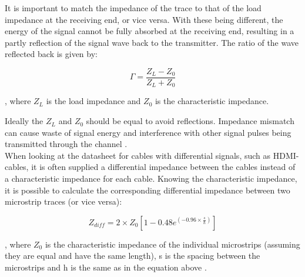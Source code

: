 \documentclass[main.tex]{subfiles}
\begin{document}
It is important to match the impedance of the trace to that of the load impedance at the receiving end, or vice versa. With these being different, the energy of the signal cannot be fully absorbed at the receiving end, resulting in a partly reflection of the signal wave back to the transmitter. The ratio of the wave reflected back is given by:

\begin{equation}
\Gamma = \frac{Z_L - Z_0}{Z_L + Z_0}	
\end{equation}

, where $Z_L$ is the load impedance and $Z_0$ is the characteristic impedance.

Ideally the $Z_L$ and $Z_0$ should be equal to avoid reflections. Impedance mismatch can cause waste of signal energy and interference with other signal pulses being transmitted through the channel \cite{weste11}. \\

When looking at the datasheet for cables with differential signals, such as HDMI-cables, it is often supplied a differential impedance between the cables instead of a characteristic impedance for each cable. Knowing the characteristic impedance, it is possible to calculate the corresponding differential impedance between two microstrip traces (or vice versa):

\begin{equation}
    Z_{diff} = 2 \times Z_0 [1 - 0.48 e^{(-0.96 \times \frac{s}{h})}]
\end{equation}

, where $Z_0$ is the characteristic impedance of the individual microstrips (assuming they are equal and have the same length), s is the spacing between the microstrips and h is the same as in the equation above \cite{douglas98}.
\end{document}
